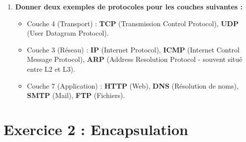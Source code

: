 \documentclass[11pt, a4paper]{article}
\begin{document}
\begin{enumerate}
    \item \textbf{Donner deux exemples de protocoles pour les couches suivantes :}
    \begin{itemize}
        \item Couche 4 (Transport) : \textbf{TCP} (Transmission Control Protocol), \textbf{UDP} (User Datagram Protocol).
        \item Couche 3 (Réseau) : \textbf{IP} (Internet Protocol), \textbf{ICMP} (Internet Control Message Protocol), \textbf{ARP} (Address Resolution Protocol - souvent situé entre L2 et L3).
        \item Couche 7 (Application) : \textbf{HTTP} (Web), \textbf{DNS} (Résolution de noms), \textbf{SMTP} (Mail), \textbf{FTP} (Fichiers).
    \end{itemize}
\end{enumerate}

\clearpage

\section{Exercice 2 : Encapsulation}
\end{document}
